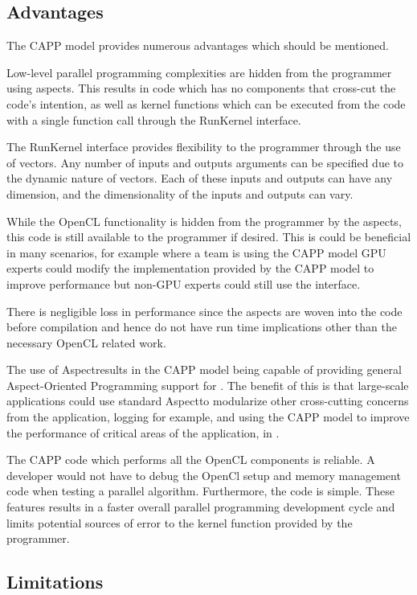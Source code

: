 \documentclass{sig-alternate-05-2015}
\begin{document}
\subsection{Advantages}

The CAPP model provides numerous advantages which should be mentioned.

Low-level parallel programming complexities are hidden from the programmer using aspects. 
This results in \CPP code which has no components that cross-cut the code's intention, as 
well as kernel functions which can be executed from the \CPP code with a single
function call through the RunKernel interface. 

The RunKernel interface provides flexibility to the programmer through the use
of vectors. Any number of inputs and outputs arguments can be specified due to
the dynamic nature of vectors. Each of these inputs and outputs can have any 
dimension, and the dimensionality of the inputs and outputs can vary.

While the OpenCL functionality is hidden from the programmer by the aspects,
this code is still available to the programmer if desired. This is could be
beneficial in many scenarios, for example where a team is using the
CAPP model GPU experts could modify the implementation provided by the
CAPP model to improve performance but non-GPU experts could still use
the \CPP interface.  

There is negligible loss in performance since the aspects are woven into the
\CPP code before compilation and hence do not have run time implications other
than the necessary OpenCL related work.

The use of Aspect\CPP results in the CAPP model being capable of
providing general Aspect-Oriented Programming support for \CPP. The benefit of this is that
large-scale applications could use standard Aspect\CPP to modularize other
cross-cutting concerns from the \CPP application, logging for example, and using the
CAPP model to improve the performance of critical areas of the
application, in \CPP.

The CAPP code which performs all the OpenCL components is reliable.
A developer would not have to debug the OpenCl setup and memory management code
when testing a parallel algorithm. Furthermore, the \CPP code is simple. These
features results in a faster overall parallel programming development cycle and
limits potential sources of error to the kernel function provided by the
programmer.

\subsection{Limitations}
\end{document}
